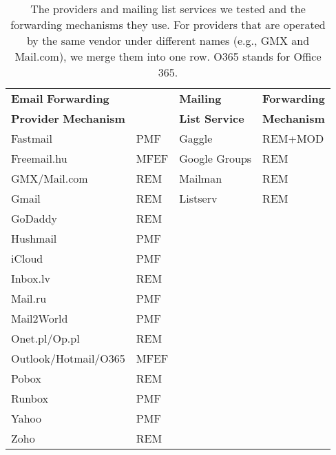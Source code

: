\begin{table}[t]
  \centering
  \begin{tabular}{ll|ll}
  \toprule
\multicolumn{2}{l}{\textbf{Email} \hfill \hspace*{0.22in}\textbf{Forwarding}} & \textbf{Mailing} & \textbf{Forwarding} \\
\multicolumn{2}{l}{\textbf{Provider} \hfill \hspace*{0.05in}\textbf{Mechanism}} & \textbf{List Service} & \textbf{Mechanism} \\
  \midrule
  Fastmail        & PMF  & Gaggle & REM+MOD \\
  Freemail.hu     & MFEF & Google Groups & REM\\
  GMX/Mail.com    & REM  & Mailman & REM  \\
  Gmail           & REM  & Listserv & REM \\
  GoDaddy         & REM  & & \\
  Hushmail        & PMF  & & \\
  iCloud          & PMF  & & \\
  Inbox.lv        & REM  & & \\
  Mail.ru         & PMF  & & \\
  Mail2World      & PMF  & & \\
  Onet.pl/Op.pl   & REM  & & \\
  Outlook/Hotmail/O365 & MFEF & & \\
  Pobox           & REM  & & \\
  Runbox          & PMF  & & \\
  Yahoo           & PMF  & & \\
  Zoho            & REM  & & \\
  \bottomrule
  \end{tabular}
  \caption{The providers and mailing list services we tested and the forwarding mechanisms they use. For providers that are operated by the same vendor under different names (e.g., GMX and Mail.com), we merge them into one row. O365 stands for Office 365.
    \label{tab:forwarding_mechs_in_the_wild}}
  \end{table}


